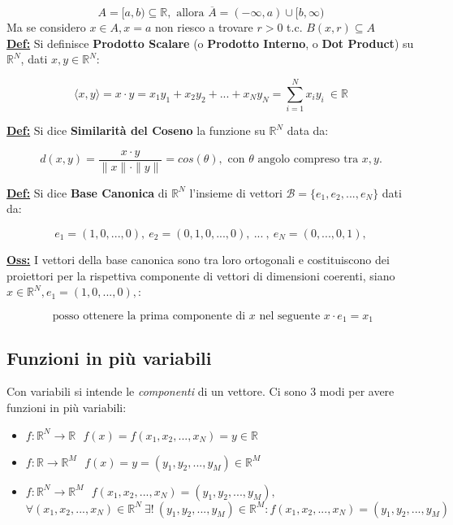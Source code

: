 \documentclass[a4paper,12pt]{article}
\newcommand{\definizione}{\noindent\textbf{\underline{Def:}} }
\begin{document}
	\[
	A = [a,b) \subseteq \mathbb{R}, \text{ allora }  \overline{A} = (-\infty , a) \cup [b, \infty) \]
	Ma se considero $x \in A, x = a$ non riesco a trovare $r > 0$ t.c. $B(x,r) \subseteq A $ \\

	\definizione Si definisce \textbf{Prodotto Scalare} (o \textbf{Prodotto Interno}, o \textbf{Dot Product}) su $\mathbb{R}^N$, dati $x,y \in \mathbb{R}^N$:

	\[
	\langle x,y \rangle = x \cdot y = x_1 y_1 + x_2 y_2 + ... + x_N y_N = \sum_{i = 1}^{N} x_i y_i \ \in \mathbb{R}
	\]

	\definizione Si dice \textbf{Similarità del Coseno} la funzione su $\mathbb{R}^N$ data da:

	\[
	d(x,y) = \frac{x \cdot y}{\|x\| \cdot \| y\|} = cos(\theta), \text{ con } \theta \text{ angolo compreso tra } x,y.
	\]

	\definizione Si dice \textbf{Base Canonica} di $\mathbb{R}^N$ l'insieme di vettori $\mathcal{B} = \{ e_1, e_2, ..., e_N \}$ dati da:

	\[
	e_1 = (1, 0, ..., 0), \
	e_2 = (0, 1, 0, ..., 0), \
	... \ , \
	e_N = (0, ..., 0, 1),
	\]

	\noindent \textbf{\underline{Oss:} } I vettori della base canonica sono tra loro ortogonali e costituiscono dei proiettori per la rispettiva componente di vettori di dimensioni coerenti, siano $x \in \mathbb{R}^N, e_1 = (1, 0, ..., 0),$:

	\[\text{ posso ottenere la prima componente di } x \text{ nel seguente } x \cdot e_1 = x_1\]

	\subsection{Funzioni in più variabili}

	Con variabili si intende le \textit{componenti} di un vettore. Ci sono 3 modi per avere funzioni in più variabili:

	\begin{itemize}
		\item $ f : \mathbb{R}^N \rightarrow \mathbb{R} \ \ \ f(x) = f(x_1,x_2, ..., x_N) = y \in \mathbb{R}$
		\item $ f : \mathbb{R} \rightarrow \mathbb{R}^M \ \ \ f(x) = y = (y_1, y_2, ..., y_M) \in \mathbb{R}^M$
		\item $ f : \mathbb{R}^N \rightarrow \mathbb{R}^M \ \ \ f(x_1, x_2, ..., x_N) = (y_1, y_2, ..., y_M),$ \\ $ \forall (x_1, x_2, ..., x_N) \in \mathbb{R}^N \ \exists! \ (y_1, y_2, ..., y_M) \in \mathbb{R}^M : f(x_1, x_2, ..., x_N) = (y_1, y_2, ..., y_M)$
	\end{itemize}
\end{document}

